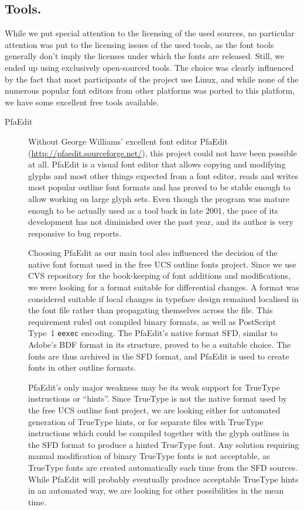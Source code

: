 \documentclass[english]{eurotex2003}
\begin{document}
\subsection{Tools.} While we put special attention to the licensing of
the used sources, no particular attention was put to the licensing
issues of the used tools, as the font tools generally don't imply the
licenses under which the fonts are released. Still, we ended up using
exclusively open-sourced tools. The choice was clearly influenced by
the fact that most participants of the project use Linux, and while
none of the numerous popular font editors from other platforms was
ported to this platform, we have some excellent free tools available.
\begin{description}
\item[PfaEdit] Without George Williams' excellent font editor PfaEdit
(\url{http://pfaedit.sourceforge.net/}), this project could not have
been possible at all. PfaEdit is a visual font editor that allows
copying and modifying glyphs and most other things expected from a
font editor, reads and writes most popular outline font formats and
has proved to be stable enough to allow working on large glyph
sets. Even though the program was mature enough to be actually used as
a tool back in late 2001, the pace of its development has not
diminished over the past year, and its author is very responsive to
bug reports.

Choosing PfaEdit as our main tool also influenced the decision of the
native font format used in the free UCS outline fonts project. Since
we use CVS repository for the book-keeping of font additions and
modifications, we were looking for a format suitable for differential
changes. A format was considered suitable if local changes in typeface
design remained localised in the font file rather than propagating
themselves across the file. This requirement ruled out compiled binary
formats, as well as PostScript Type~1 \texttt{eexec} encoding. The
PfaEdit's native format SFD, similar to Adobe's BDF format in its
structure, proved to be a suitable choice. The fonts are thus archived
in the SFD format, and PfaEdit is used to create fonts in other
outline formats.

PfaEdit's only major weakness may be its weak support for TrueType
instructions or ``hints''. Since TrueType is not the native format
used by the free UCS outline font project, we are looking either for
automated generation of TrueType hints, or for separate files with
TrueType instructions which could be compiled together with the glyph
outlines in the SFD format to produce a hinted TrueType font. Any
solution requiring manual modification of binary TrueType fonts is not
acceptable, as TrueType fonts are created automatically each time from
the SFD sources. While PfaEdit will probably eventually produce
acceptable TrueType hints in an automated way, we are looking for
other possibilities in the mean time.


\end{description}
\end{document}

